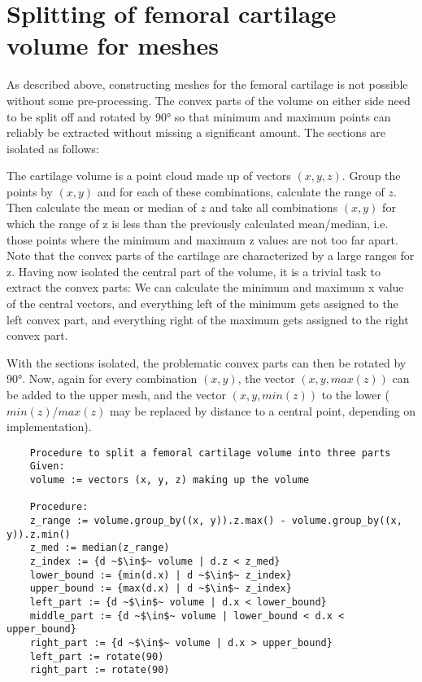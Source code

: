 \section{Splitting of femoral cartilage volume for meshes}
\label{sec:Splitting}
As described above, constructing meshes for the femoral cartilage is not possible without some pre-processing. The convex parts of the volume on either side need to be split off and rotated by 90° so that minimum and maximum points can reliably be extracted without missing a significant amount. The sections are isolated as follows: 
\par\noindent
The cartilage volume is a point cloud made up of vectors $(x, y, z)$. Group the points by $(x, y)$ and for each of these combinations, calculate the range of $z$. Then calculate the mean or median of $z$ and take all combinations $(x, y)$ for which the range of z is less than the previously calculated mean/median, i.e. those points where the minimum and maximum z values are not too far apart. Note that the convex parts of the cartilage are characterized by a large ranges for z. Having now isolated the central part of the volume, it is a trivial task to extract the convex parts: We can calculate the minimum and maximum x value of the central vectors, and everything left of the minimum gets assigned to the left convex part, and everything right of the maximum gets assigned to the right convex part.
\par\noindent
With the sections isolated, the problematic convex parts can then be rotated by 90°. Now, again for every combination $(x, y)$, the vector $(x, y, max(z))$ can be added to the upper mesh, and the vector $(x, y, min(z))$ to the lower ($min(z)$/$max(z)$ may be replaced by distance to a central point, depending on implementation).

\begin{verbatim}
	Procedure to split a femoral cartilage volume into three parts
	Given:
	volume := vectors (x, y, z) making up the volume
	
	Procedure:
	z_range := volume.group_by((x, y)).z.max() - volume.group_by((x, y)).z.min()
	z_med := median(z_range)
	z_index := {d ~$\in$~ volume | d.z < z_med}
	lower_bound := {min(d.x) | d ~$\in$~ z_index}
	upper_bound := {max(d.x) | d ~$\in$~ z_index}
	left_part := {d ~$\in$~ volume | d.x < lower_bound}
	middle_part := {d ~$\in$~ volume | lower_bound < d.x < upper_bound}
	right_part := {d ~$\in$~ volume | d.x > upper_bound}
	left_part := rotate(90)
	right_part := rotate(90)
\end{verbatim} 